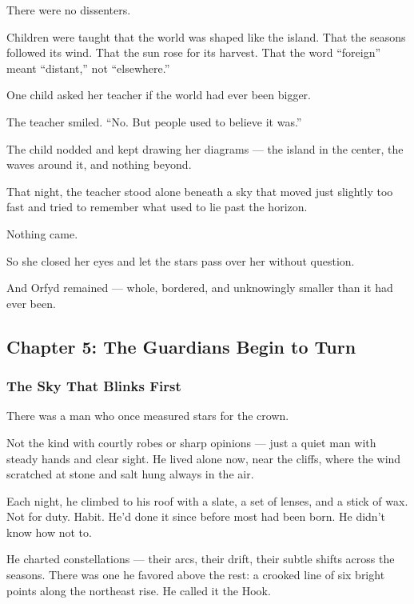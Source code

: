 \documentclass[12pt]{article}
\begin{document}
There were no dissenters.

Children were taught that the world was shaped like the island. That the seasons followed its wind. That the sun rose for its harvest. That the word ``foreign'' meant ``distant,'' not ``elsewhere.''

One child asked her teacher if the world had ever been bigger.

The teacher smiled. ``No. But people used to believe it was.''

The child nodded and kept drawing her diagrams — the island in the center, the waves around it, and nothing beyond.

That night, the teacher stood alone beneath a sky that moved just slightly too fast and tried to remember what used to lie past the horizon.

Nothing came.

So she closed her eyes and let the stars pass over her without question.

And Orfyd remained — whole, bordered, and unknowingly smaller than it had ever been.

\newpage

\subsection{Chapter 5: The Guardians Begin to Turn}

\vspace{.5in}

\subsubsection{The Sky That Blinks First}

There was a man who once measured stars for the crown.

Not the kind with courtly robes or sharp opinions — just a quiet man with steady hands and clear sight. He lived alone now, near the cliffs, where the wind scratched at stone and salt hung always in the air.

Each night, he climbed to his roof with a slate, a set of lenses, and a stick of wax. Not for duty. Habit. He’d done it since before most had been born. He didn’t know how not to.

He charted constellations — their arcs, their drift, their subtle shifts across the seasons. There was one he favored above the rest: a crooked line of six bright points along the northeast rise. He called it the Hook.
\end{document}
